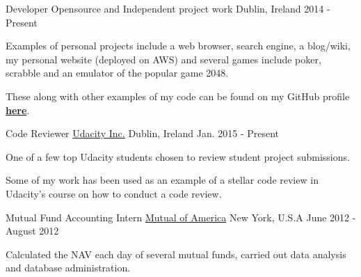 \begin{cventries}
 \cventry
    {Developer}
    {Opensource and Independent project work}
    {Dublin, Ireland}
    {2014 - Present}
    {
      \begin{cvitems}
        \item {Examples of personal projects include a web browser, search engine, a blog/wiki, my personal website (deployed on AWS) and several games include poker, scrabble and an emulator of the popular game 2048.}
        \item {These along with other examples of my code can be found on my GitHub profile \href{https://github.com/xkal36}{\textcolor{awesome-skyblue}{\textbf{here}}}}.
        \end{cvitems}
    }
  
  
  \cventry
    {Code Reviewer}
    {\href{https://www.udacity.com/}{Udacity Inc.}}
    {Dublin, Ireland}
    {Jan. 2015 - Present}
    {
      \begin{cvitems}
        \item {One of a few top Udacity students chosen to review student project submissions.}
        \item {Some of my work has been used as an example of a stellar code review in Udacity's course on how to conduct a code review.}
      \end{cvitems}
    }
  \cventry
    {Mutual Fund Accounting Intern}
    {\href{https://www.mutualofamerica.com/}{Mutual of America}}
    {New York, U.S.A}
    {June 2012 - August 2012}
    {
      \begin{cvitems}
        \item {Calculated the NAV each day of several mutual funds, carried out data analysis and database administration.}
      \end{cvitems}
    }
    
  
 
\end{cventries}


